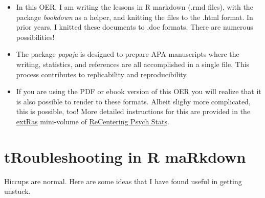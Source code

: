 \documentclass[
  11pt,
]{book}
\providecommand{\tightlist}{%
  \setlength{\itemsep}{0pt}\setlength{\parskip}{0pt}}
\begin{document}
\begin{itemize}
\tightlist
\item
  In this OER, I am writing the lessons in R markdown (.rmd files), with the package \emph{bookdown} as a helper, and knitting the files to the .html format. In prior years, I knitted these documents to .doc formats. There are numerous possibilities!
\item
  The package \emph{papaja} is designed to prepare APA manuscripts where the writing, statistics, and references are all accomplished in a single file. This process contributes to replicability and reproducibility.
\item
  If you are using the PDF or ebook version of this OER you will realize that it is also possible to render to these formats. Albeit slighy more complicated, this is possible, too! More detailed instructions for this are provided in the \href{https://lhbikos.github.io/extRas/}{extRas} mini-volume of \href{https://lhbikos.github.io/BikosRVT/ReCenter.html}{ReCentering Psych Stats}.
\end{itemize}

\hypertarget{troubleshooting-in-r-markdown}{%
\section{tRoubleshooting in R maRkdown}\label{troubleshooting-in-r-markdown}}

Hiccups are normal. Here are some ideas that I have found useful in getting unstuck.
\end{document}
